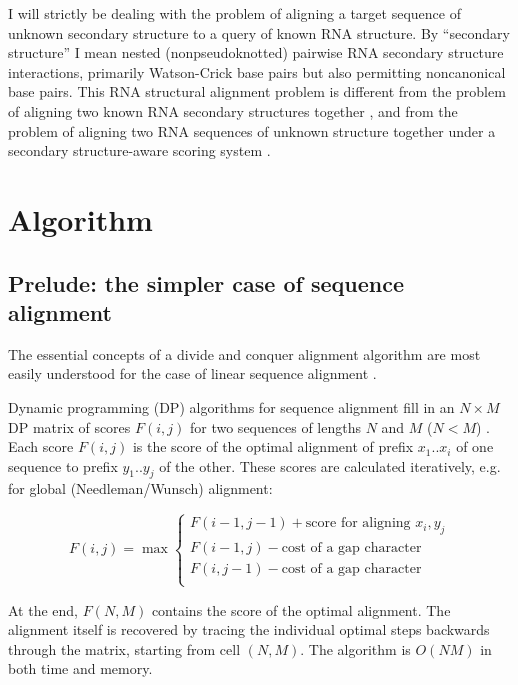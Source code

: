 \documentclass[11pt]{article}
\begin{document}
I will strictly be dealing with the problem of aligning a target
sequence of unknown secondary structure to a query of known RNA
structure. By ``secondary structure'' I mean nested (nonpseudoknotted)
pairwise RNA secondary structure interactions, primarily Watson-Crick
base pairs but also permitting noncanonical base pairs. This RNA
structural alignment problem is different from the problem of aligning
two known RNA secondary structures together \cite{Shapiro90}, and from
the problem of aligning two RNA sequences of unknown structure
together under a secondary structure-aware scoring system
\cite{Sankoff85,Gorodkin01,MathewsTurner02}.

\section{Algorithm}

\subsection{Prelude: the simpler case of sequence alignment}

The essential concepts of a divide and conquer alignment algorithm are
most easily understood for the case of linear sequence alignment
\cite{Hirschberg75,MyM-88a}.

Dynamic programming (DP) algorithms for sequence alignment fill in an
$N \times M$ DP matrix of scores $F(i,j)$ for two sequences of lengths
$N$ and $M$ ($N < M$)  \cite{Needleman70,Smith81}. Each score
$F(i,j)$ is the score of the optimal alignment of prefix $x_1..x_i$ of
one sequence to prefix $y_1..y_j$ of the other. These scores are
calculated iteratively, e.g.  for global (Needleman/Wunsch) alignment:

\[  F(i,j) = \max \left\{ \begin{array}{l}
                       F(i-1,j-1) + \mbox{score for aligning $x_i, y_j$} \\
                       F(i-1,j) - \mbox{cost of a gap character} \\
                       F(i,j-1) - \mbox{cost of a gap character} \\
                       \end{array} \right. \]

At the end, $F(N,M)$ contains the score of the optimal alignment. The
alignment itself is recovered by tracing the individual optimal steps
backwards through the matrix, starting from cell $(N,M)$. The
algorithm is $O(NM)$ in both time and memory.
\end{document}
